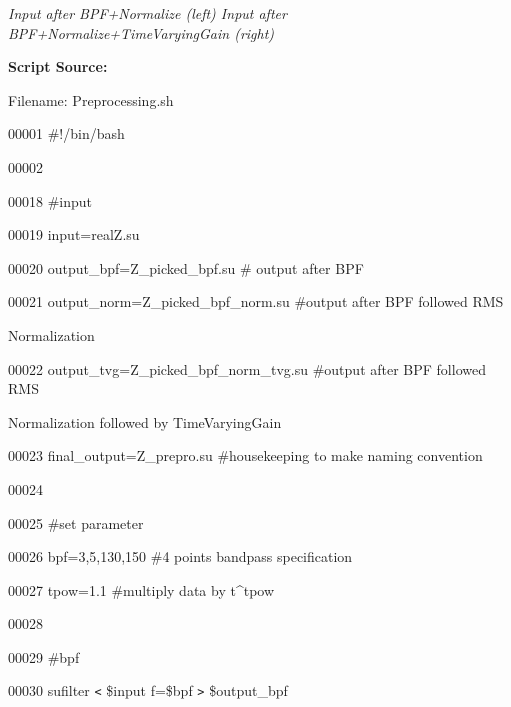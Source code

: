 \documentclass{article}
\begin{document}
\begin{center}
\vspace{16pt}
\textit{Input after BPF+Normalize (left) Input after BPF+Normalize+TimeVaryingGain 
(right)}
\end{center}

\vspace{40pt}
\baselineskip=12pt
\leftskip=0pt
\textbf{Script Source:}

\vspace{4pt}
Filename: Preprocessing.sh

\vspace{16pt}
00001 \#!/bin/bash

\vspace{4pt}
00002 

\vspace{4pt}
00018 \#input

\vspace{4pt}
00019 input=realZ.su

\vspace{4pt}
00020 output\_bpf=Z\_picked\_bpf.su \# output after BPF

\vspace{4pt}
00021 output\_norm=Z\_picked\_bpf\_norm.su \#output after BPF followed RMS 

\vspace{4pt}
Normalization

\vspace{4pt}
00022 output\_tvg=Z\_picked\_bpf\_norm\_tvg.su \#output after BPF followed RMS 

\vspace{4pt}
Normalization followed by TimeVaryingGain

\vspace{4pt}
00023 final\_output=Z\_prepro.su \#housekeeping to make naming convention

\vspace{4pt}
00024 

\vspace{4pt}
00025 \#set parameter

\vspace{4pt}
00026 bpf=3,5,130,150 \#4 points bandpass specification

\vspace{4pt}
00027 tpow=1.1 \#multiply data by t\textasciicircum{}tpow

\vspace{4pt}
00028 

\vspace{4pt}
00029 \#bpf

\vspace{4pt}
00030 sufilter \texttt{<} \$input f=\$bpf \texttt{>} \$output\_bpf
\end{document}
